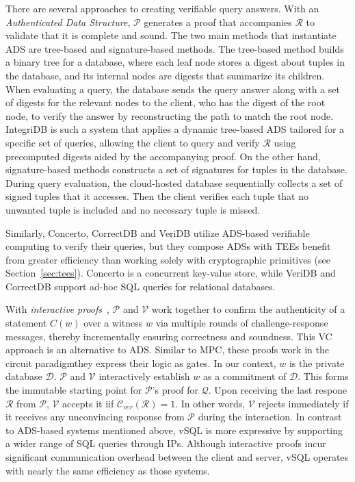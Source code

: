 \documentclass[11pt]{article}
\newcommand{\db}{$\mathcal{D}$\xspace}
\newcommand{\answer}{$\mathcal{R}$\xspace}
\newcommand{\query}{$\mathcal{Q}$\xspace}
\newcommand{\prover}{$\mathcal{P}$\xspace}
\newcommand{\verifier}{$\mathcal{V}$\xspace}
\begin{document}
There are several approaches to creating verifiable query answers.  With an {\em Authenticated Data Structure}, \prover generates a proof that accompanies \answer to validate that it is complete and sound.  The two main methods that instantiate ADS are tree-based and signature-based methods.  The tree-based method builds a binary tree for a database, where each leaf node stores a digest about tuples in the database, and its internal nodes are digests that summarize its children.   When evaluating a query, the database sends the query answer along with a set of digests for the relevant nodes to the client, who has the digest of the root node, to verify the answer by reconstructing the path to match the root node. IntegriDB is such a system that applies a dynamic tree-based ADS tailored for a specific set of queries, allowing the client to query and verify $\mathcal{R}$ using precomputed digests aided by the accompanying proof. On the other hand, signature-based methods constructs a set of signatures for tuples in the database. During query evaluation, the cloud-hosted database sequentially collects a set of signed tuples that it accesses. Then the client verifies each tuple that no unwanted tuple is included and no necessary tuple is missed.

Similarly, Concerto, CorrectDB and VeriDB utilize ADS-based verifiable computing to verify their queries, but they compose ADSs with TEEs benefit from greater efficiency than working solely with cryptographic primitives (see Section~\ref{sec:tees}). Concerto is a concurrent key-value store, while VeriDB and CorrectDB support ad-hoc SQL queries for relational databases.

With {\em interactive proofs}~\cite{zhang2015integridb}, \prover and \verifier  work together to confirm the authenticity of  a statement $C(w)$ over a witness $w$ via multiple rounds of challenge-response messages, thereby incrementally ensuring correctness and soundness.  This VC approach is an alternative to ADS.  Similar to MPC, these proofs work in the circuit paradigm\textendash they express their logic as gates. In our context, $w$ is the private database $\mathcal{D}$.  \prover and \verifier interactively establish $w$ as a commitment of \db.  This forms the immutable starting point for \prover's proof for \query. Upon receiving the last respone $\mathcal{R}$ from \prover, \verifier accepts it iif $\mathcal{C}_{ver}(\mathcal{R})=1$. In other words, \verifier rejects immediately if it receives any unconvincing response from \prover during the interaction. In contrast to ADS-based systems mentioned above, vSQL is more expressive by supporting a wider range of SQL queries through IPs. Although interactive proofs incur significant communication overhead between the client and server, vSQL operates with nearly the same efficiency as those systems.
\end{document}
